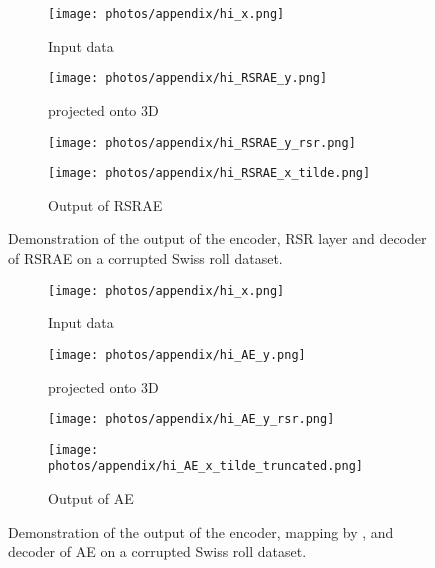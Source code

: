 \documentclass{article} \usepackage{iclr2020_conference,times}
\begin{document}
\begin{figure}[ht]
\centering
\begin{subfigure}{0.3\textwidth}
\centering
    \texttt{[image: photos/appendix/hi\_x.png]}
    \caption{Input data }
\label{fig:RSRAE_x}
\end{subfigure}{\large}\begin{subfigure}{0.3\textwidth}
\centering
    \texttt{[image: photos/appendix/hi\_RSRAE\_y.png]}
    \caption{ projected onto 3D}
\label{fig:RSRAE_y}
\end{subfigure}
{\large}\begin{subfigure}{0.3\textwidth}
\centering
    \texttt{[image: photos/appendix/hi\_RSRAE\_y\_rsr.png]}
    \caption{ }
\label{fig:RSRAE_yrsr}
\end{subfigure}
{\large}\begin{subfigure}{0.3\textwidth}
\centering
    \texttt{[image: photos/appendix/hi\_RSRAE\_x\_tilde.png]}
    \caption{Output of RSRAE \\ }
\label{fig:RSRAE_xtilde}
\end{subfigure}


\caption{{Demonstration of the output of the encoder, RSR layer and decoder of RSRAE on a corrupted Swiss roll dataset.}}
\label{fig:RSRAE_structure}

\end{figure}


\begin{figure}[ht]
\centering
\begin{subfigure}{0.3\textwidth}
\centering
    \texttt{[image: photos/appendix/hi\_x.png]}
    \caption{Input data }
\label{fig:AE_x}
\end{subfigure}
{\large}\begin{subfigure}{0.3\textwidth}
\centering
    \texttt{[image: photos/appendix/hi\_AE\_y.png]}
    \caption{ projected onto 3D}
\label{fig:AE_y}
\end{subfigure}
{\large}\begin{subfigure}{0.3\textwidth}
\centering
    \texttt{[image: photos/appendix/hi\_AE\_y\_rsr.png]}
    \caption{}
\label{fig:AE_yrsr}
\end{subfigure}
{\large}\begin{subfigure}{0.3\textwidth}
\centering
    \texttt{[image: photos/appendix/hi\_AE\_x\_tilde\_truncated.png]}
    \caption{Output of AE \\ }
\label{fig:AE_xtilde}
\end{subfigure}
\caption{{Demonstration of the output of the encoder, mapping by , and decoder of AE on a corrupted Swiss roll dataset.}}
\label{fig:AE_structure}
\end{figure}
\end{document}
